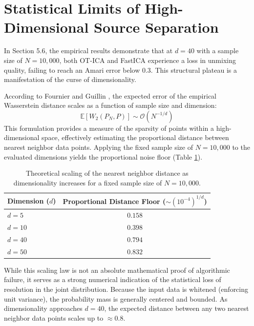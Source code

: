 \documentclass[12pt,a4paper,twoside,openany]{book}
\begin{document}
\section{Statistical Limits of High-Dimensional Source Separation}
\label{app:curse_of_dimensionality}

In Section 5.6, the empirical results demonstrate that at $d=40$ with a sample size of $N=10,000$, both OT-ICA and FastICA experience a loss in unmixing quality, 
failing to reach an Amari error below $0.3$. This structural plateau is a manifestation of the curse of dimensionality. 

According to Fournier and Guillin \citeyear{fournier2015rate}, the expected error of the empirical Wasserstein distance scales as a function of sample size and dimension:
\begin{equation}
    \mathbb{E}[W_2(P_N, P)] \sim \mathcal{O}(N^{-1/d})
\end{equation}
This formulation provides a measure of the sparsity of points within a high-dimensional space, effectively estimating the proportional distance between 
nearest neighbor data points. Applying the fixed sample size of $N=10,000$ to the evaluated dimensions yields the proportional noise floor (Table \ref{tab:nearest_neighbor_sparsity}).

\begin{table}[htbp]
    \centering
    \begin{tabular}{lc}
        \toprule
        \textbf{Dimension ($d$)} & \textbf{Proportional Distance Floor ($\sim (10^{-4})^{1/d}$)} \\
        \midrule
        $d = 5$ & $0.158$ \\
        $d = 10$ & $0.398$ \\
        $d = 40$ & $0.794$ \\
        $d = 50$ & $0.832$ \\
        \bottomrule
    \end{tabular}
    \caption[Expected Sparsity in High Dimensions]{Theoretical scaling of the nearest neighbor distance as dimensionality increases for a fixed sample size of $N=10,000$.}
    \label{tab:nearest_neighbor_sparsity}
\end{table}

While this scaling law is not an absolute mathematical proof of algorithmic failure, it serves as a strong numerical indication of the statistical loss of 
resolution in the joint distribution. Because the input data is whitened (enforcing unit variance), the probability mass is generally centered and bounded. 
As dimensionality approaches $d=40$, the expected distance between any two nearest neighbor data points scales up to $\approx 0.8$. 
\end{document}
